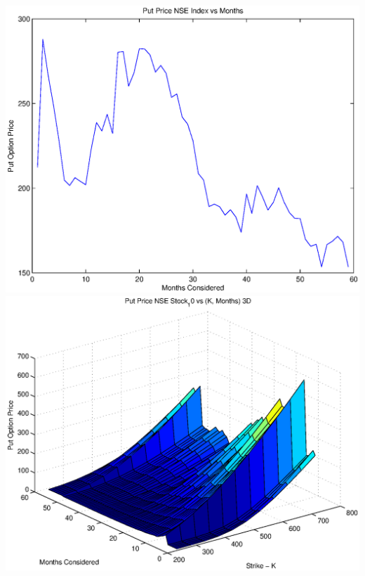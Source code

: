 \documentclass{article}
\begin{document}
\includegraphics[width=\textwidth]{Put_Price_NSE_Index_vs_Months} \\

\includegraphics[width=\textwidth]{Put_Price_NSE_Stock_10_vs_(K,_Months)_3D} \\
\end{document}
